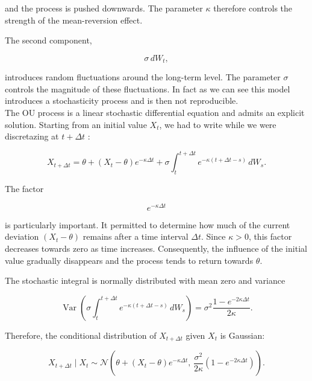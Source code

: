 \documentclass{article}
\begin{document}
and the process is pushed downwards. The parameter $\kappa$ therefore
controls the strength of the mean-reversion effect.

The second component,

\begin{equation}
\sigma\,dW_t,
\end{equation}

introduces random fluctuations around the long-term level. The
parameter $\sigma$ controls the magnitude of these fluctuations. In fact as we can see this model introduces a stochasticity process and is then not reproducible.  
\\

The OU process is a linear stochastic differential equation and admits
an explicit solution. Starting from an initial value $X_t$, we had to write while we were discretazing at $t+\Delta t$ :

\begin{equation}
X_{t+\Delta t}
=
\theta
+
(X_t-\theta)e^{-\kappa\Delta t}
+
\sigma
\int_t^{t+\Delta t}
e^{-\kappa(t+\Delta t-s)}
\,dW_s.
\end{equation}

The factor

\begin{equation}
e^{-\kappa\Delta t}
\end{equation}

is particularly important. It permitted to determine how much of the current deviation $(X_t-\theta)$ remains after a time interval $\Delta t$. Since $\kappa>0$, this factor decreases towards zero as time increases. Consequently, the influence of the initial value gradually disappears and the process tends to return towards $\theta$.

The stochastic integral is normally distributed with mean zero and
variance

\begin{equation}
\operatorname{Var}
\left(
\sigma
\int_t^{t+\Delta t}
e^{-\kappa(t+\Delta t-s)}
\,dW_s
\right)
=
\sigma^2
\frac{1-e^{-2\kappa\Delta t}}{2\kappa}.
\end{equation}

Therefore, the conditional distribution of $X_{t+\Delta t}$ given
$X_t$ is Gaussian:

\begin{equation}
X_{t+\Delta t}\mid X_t
\sim
\mathcal{N}
\left(
\theta+(X_t-\theta)e^{-\kappa\Delta t},
\,
\frac{\sigma^2}{2\kappa}
\left(1-e^{-2\kappa\Delta t}\right)
\right).
\end{equation}
\end{document}
